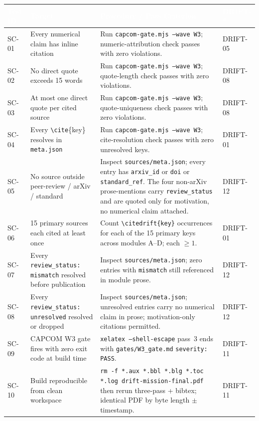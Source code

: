 \documentclass[11pt,letterpaper]{article}
\newcommand{\tableheader}[1]{\textbf{\sffamily\textcolor{white}{#1}}}
\begin{document}
\begin{center}
\small
\begin{tabularx}{\textwidth}{L{1.8cm}L{4.4cm}XL{1.8cm}}
\toprule
{}
\tableheader{Test ID} & \tableheader{Target} & \tableheader{Procedure / Pass Criterion} & \tableheader{DRIFT-*} \\
\midrule
SC-01 & Every numerical claim has inline citation & Run \texttt{capcom-gate.mjs --wave W3}; numeric-attribution check passes with zero violations. & DRIFT-05 \\
SC-02 & No direct quote exceeds 15 words & Run \texttt{capcom-gate.mjs --wave W3}; quote-length check passes with zero violations. & DRIFT-08 \\
SC-03 & At most one direct quote per cited source & Run \texttt{capcom-gate.mjs --wave W3}; quote-uniqueness check passes with zero violations. & DRIFT-08 \\
SC-04 & Every \texttt{\textbackslash cite}\{key\} resolves in \texttt{meta.json} & Run \texttt{capcom-gate.mjs --wave W3}; cite-resolution check passes with zero unresolved keys. & DRIFT-01 \\
SC-05 & No source outside peer-review / arXiv / standard & Inspect \texttt{sources/meta.json}; every entry has \texttt{arxiv\_id} or \texttt{doi} or \texttt{standard\_ref}. The four non-arXiv prose-mentions carry \texttt{review\_status} and are quoted only for motivation, no numerical claim attached. & DRIFT-12 \\
SC-06 & 15 primary sources each cited at least once & Count \texttt{\textbackslash citedrift\{key\}} occurrences for each of the 15 primary keys across modules A--D; each $\geq 1$. & DRIFT-01 \\
SC-07 & Every \texttt{review\_status: mismatch} resolved before publication & Inspect \texttt{sources/meta.json}; zero entries with \texttt{mismatch} still referenced in module prose. & DRIFT-12 \\
SC-08 & Every \texttt{review\_status: unresolved} resolved or dropped & Inspect \texttt{sources/meta.json}; unresolved entries carry no numerical claim in prose; motivation-only citations permitted. & DRIFT-12 \\
SC-09 & CAPCOM W3 gate fires with zero exit code at build time & \texttt{xelatex --shell-escape} pass~3 ends with \texttt{gates/W3\_gate.md} \texttt{severity: PASS}. & DRIFT-11 \\
SC-10 & Build reproducible from clean workspace & \texttt{rm -f *.aux *.bbl *.blg *.toc *.log drift-mission-final.pdf} then rerun three-pass + bibtex; identical PDF by byte length $\pm$ timestamp. & DRIFT-11 \\
\bottomrule
\end{tabularx}
\end{center}
\end{document}
